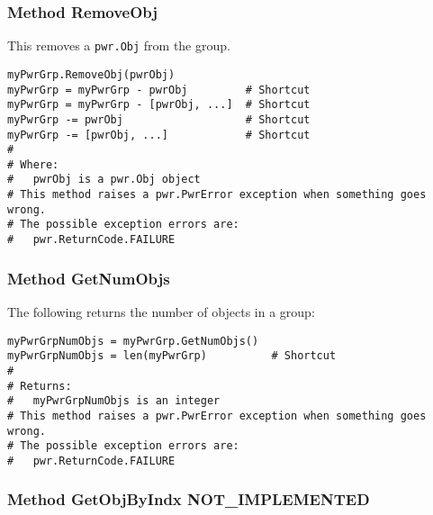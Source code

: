 \subsubsection{Method RemoveObj} \label{meth:RemoveObj}

This removes a \texttt{pwr.Obj} from the group.

\begin{center}\begin{minipage}{.95\linewidth}\begin{lstlisting}
myPwrGrp.RemoveObj(pwrObj)
myPwrGrp = myPwrGrp - pwrObj         # Shortcut
myPwrGrp = myPwrGrp - [pwrObj, ...]  # Shortcut
myPwrGrp -= pwrObj                   # Shortcut
myPwrGrp -= [pwrObj, ...]            # Shortcut
#
# Where:
#   pwrObj is a pwr.Obj object
# This method raises a pwr.PwrError exception when something goes wrong.
# The possible exception errors are:
#   pwr.ReturnCode.FAILURE
\end{lstlisting}\end{minipage}\end{center}

\subsubsection{Method GetNumObjs} \label{meth:GetNumObjs}

The following returns the number of objects in a group:

\begin{center}\begin{minipage}{.95\linewidth}\begin{lstlisting}
myPwrGrpNumObjs = myPwrGrp.GetNumObjs()
myPwrGrpNumObjs = len(myPwrGrp)          # Shortcut
#
# Returns:
#   myPwrGrpNumObjs is an integer
# This method raises a pwr.PwrError exception when something goes wrong.
# The possible exception errors are:
#   pwr.ReturnCode.FAILURE
\end{lstlisting}\end{minipage}\end{center}

\subsubsection{Method GetObjByIndx NOT_IMPLEMENTED} \label{meth:GetObjByIndx}

